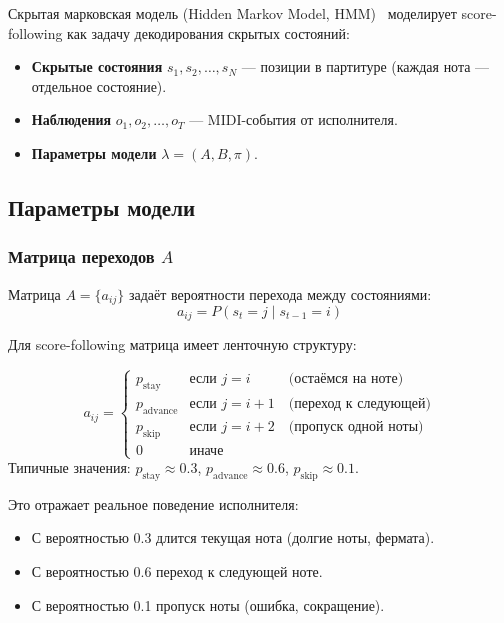 \documentclass[a4paper,11pt]{article}
\begin{document}
\begin{defbox}[title={HMM для score-following}]
Скрытая марковская модель (Hidden Markov Model, HMM)~\cite{rabiner1989}
моделирует score-following как задачу декодирования скрытых состояний:

\begin{itemize}[leftmargin=1.5em]
  \item \textbf{Скрытые состояния} $s_1, s_2, \ldots, s_N$ --- позиции
        в партитуре (каждая нота --- отдельное состояние).
  \item \textbf{Наблюдения} $o_1, o_2, \ldots, o_T$ --- MIDI-события
        от исполнителя.
  \item \textbf{Параметры модели} $\lambda = (A, B, \pi)$.
\end{itemize}
\end{defbox}

\subsection{Параметры модели}

\subsubsection{Матрица переходов $A$}

Матрица $A = \{a_{ij}\}$ задаёт вероятности перехода между состояниями:
\[
  a_{ij} = P(s_t = j \mid s_{t-1} = i)
\]

Для score-following матрица имеет ленточную структуру:

\begin{formulabox}[title={Матрица переходов}]
\[
  a_{ij} =
  \begin{cases}
    p_{\text{stay}}    & \text{если } j = i \quad\quad\;\;\, \text{(остаёмся на ноте)} \\
    p_{\text{advance}} & \text{если } j = i + 1 \quad \text{(переход к следующей)} \\
    p_{\text{skip}}    & \text{если } j = i + 2 \quad \text{(пропуск одной ноты)} \\
    0                  & \text{иначе}
  \end{cases}
\]
Типичные значения: $p_{\text{stay}} \approx 0.3$, $p_{\text{advance}} \approx 0.6$,
$p_{\text{skip}} \approx 0.1$.
\end{formulabox}

Это отражает реальное поведение исполнителя:
\begin{itemize}[leftmargin=2em]
  \item С вероятностью 0.3 длится текущая нота (долгие ноты, фермата).
  \item С вероятностью 0.6 переход к следующей ноте.
  \item С вероятностью 0.1 пропуск ноты (ошибка, сокращение).
\end{itemize}
\end{document}
